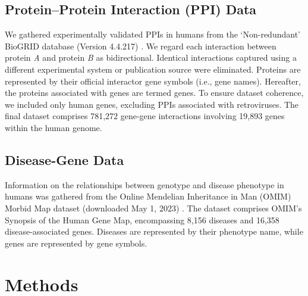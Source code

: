 \documentclass[journal,twoside,web]{ieeecolor}
\begin{document}
\subsection{Protein–Protein Interaction (PPI) Data}
\label{sec:PPI_data}
We gathered experimentally validated PPIs in humans from the `Non-redundant' BioGRID database (Version 4.4.217) \cite{oughtred2021biogrid}.
We regard each interaction between protein \textit{A} and protein \textit{B} as bidirectional.
Identical interactions captured using a different experimental system or publication source were eliminated.
Proteins are represented by their official interactor gene symbols (i.e., gene names).
Hereafter, the proteins associated with genes are termed genes.
To ensure dataset coherence, we included only human genes, excluding PPIs associated with retroviruses.
The final dataset comprises 781,272 gene-gene interactions involving 19,893 genes within the human genome.

\subsection{Disease-Gene Data}
\label{sec:OMIM_data}
Information on the relationships between genotype and disease phenotype in humans was gathered from the Online Mendelian Inheritance in Man (OMIM) Morbid Map dataset (downloaded May 1, 2023) \cite{amberger2015omim}.
The dataset comprises OMIM's Synopsis of the Human Gene Map, encompassing 8,156 diseases and 16,358 disease-associated genes.
Diseases are represented by their phenotype name, while genes are represented by gene symbols.

\section{Methods
}\label{sec:methods}
\end{document}
